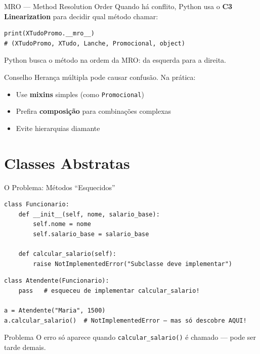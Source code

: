 \documentclass[aspectratio=169]{beamer}
\begin{document}
\begin{frame}[fragile]{MRO — Method Resolution Order}
  Quando há conflito, Python usa o \textbf{C3 Linearization} para decidir qual método chamar:

  \begin{lstlisting}
print(XTudoPromo.__mro__)
# (XTudoPromo, XTudo, Lanche, Promocional, object)
  \end{lstlisting}

  Python busca o método na ordem da MRO: da esquerda para a direita.

  \begin{alertblock}{Conselho}
    Herança múltipla pode causar confusão. Na prática:
    \begin{itemize}
      \item Use \textbf{mixins} simples (como \texttt{Promocional})
      \item Prefira \textbf{composição} para combinações complexas
      \item Evite hierarquias diamante
    \end{itemize}
  \end{alertblock}
\end{frame}

\section{Classes Abstratas}

\begin{frame}[fragile]{O Problema: Métodos ``Esquecidos''}
  \begin{lstlisting}
class Funcionario:
    def __init__(self, nome, salario_base):
        self.nome = nome
        self.salario_base = salario_base

    def calcular_salario(self):
        raise NotImplementedError("Subclasse deve implementar")
  \end{lstlisting}

  \begin{lstlisting}
class Atendente(Funcionario):
    pass   # esqueceu de implementar calcular_salario!

a = Atendente("Maria", 1500)
a.calcular_salario()  # NotImplementedError — mas só descobre AQUI!
  \end{lstlisting}

  \begin{alertblock}{Problema}
    O erro só aparece quando \texttt{calcular\_salario()} é chamado — pode ser tarde demais.
  \end{alertblock}
\end{frame}
\end{document}
